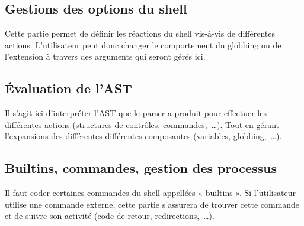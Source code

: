 \subsection{Gestions des options du shell}

Cette partie permet de définir les réactions du shell vis-à-vis de différentes
actions. L'utilisateur peut donc changer le comportement du globbing ou de
l'extension à travers des arguments qui seront gérés ici.

\subsection{Évaluation de l'AST}

Il s'agit ici d'interpréter l'AST que le parser a produit pour effectuer les
différentes actions (structures de contrôles, commandes,~\dots). Tout en gérant
l'expansions des différentes différentes composantes (variables,
globbing,~\dots).

\subsection{Builtins, commandes, gestion des processus}

Il faut coder certaines commandes du shell appellées « builtins ». Si
l'utilisateur utilise une commande externe, cette partie s'assurera de trouver
cette commande et de suivre son activité (code de retour, redirections,~\dots).
